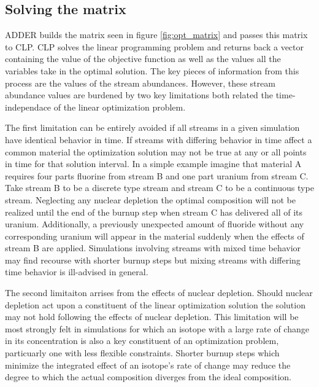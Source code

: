 \documentclass[]{elsarticle}
\begin{document}
\subsection{Solving the matrix} \label{ssec:solving}
ADDER builds the matrix seen in figure \ref{fig:opt_matrix} and passes this
matrix to CLP. CLP solves the linear programming problem and returns back a
vector containing the value of the objective function as well as the values
all the variables take in the optimal solution. The key pieces of information 
from this process are the values of the stream abundances. However, these
stream abundance values are burdened by two key limitations both related the
time-independace of the linear optimization problem. 

The first limitation can be entirely avoided if all streams in a given
simulation have identical behavior in time. If streams with differing behavior
in time affect a common material the optimization solution may not be true at
any or all points in time for that solution interval. In a simple example
imagine that material A requires four parts fluorine from stream B and one part
uranium from stream C. Take stream B to be a discrete type stream and stream C
to be a continuous type stream. Neglecting any nuclear depletion the optimal
composition will not be realized until the end of the burnup step when stream C
has delivered all of its uranium. Additionally, a previously unexpected amount
of fluoride without any corresponding uranium will appear in the material 
suddenly when the effects of stream B are applied.
Simulations involving streams with mixed time
behavior may find recourse with shorter burnup steps but mixing streams with
differing time behavior is ill-advised in general.

The second limitaiton arrises from the effects of nuclear depletion. Should
nuclear depletion act upon a constituent of the linear optimization solution
the solution may not hold following the effects of nuclear depletion. This
limitation will be most strongly felt in simulations for which an isotope
with a large rate of change in its concentration is also a key constituent of
an optimization problem, particuarly one with less flexible constraints. Shorter
burnup steps which minimize the integrated effect of an isotope's rate of change
may reduce the degree to which the actual composition diverges from the ideal
composition.
\end{document}
